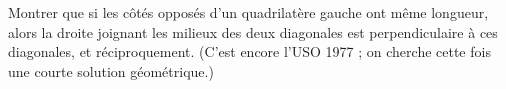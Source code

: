 Montrer que si les côtés opposés d'un quadrilatère gauche ont même longueur, alors la droite joignant les milieux des deux diagonales est perpendiculaire à ces diagonales, et réciproquement. (C'est encore l'USO 1977 ; on cherche cette fois une courte solution géométrique.)
